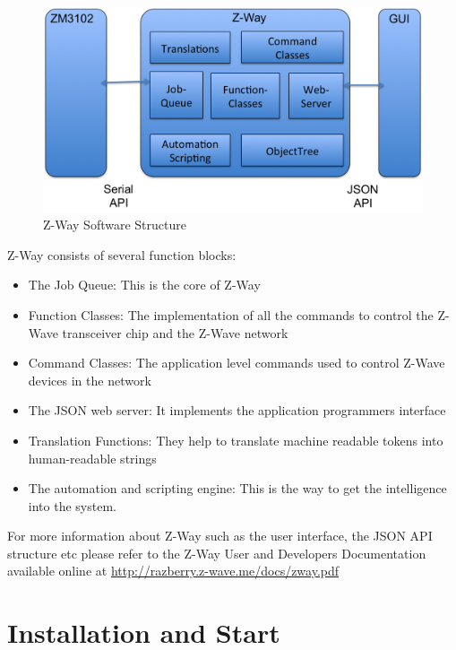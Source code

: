 \documentclass[10pt]{article}
\begin{document}
\begin{figure} 
\begin{center}
\includegraphics[scale=0.6]{pics/zway1en.png}
\caption{Z-Way Software Structure}
\label{zwaystructure} 
\end{center} 
\end{figure}

Z-Way consists of several function blocks:

\begin{itemize}
\item The Job Queue: This is the core of Z-Way
\item Function Classes: The implementation of all the commands to control the Z-Wave transceiver chip and the Z-Wave network
\item Command Classes: The application level commands used to control Z-Wave devices in the network
\item The JSON web server: It implements the application programmers interface
\item Translation Functions: They help to translate machine readable tokens into human-readable strings
\item The automation and scripting engine: This is the way to get the intelligence into the system.
\end{itemize}

For more information about Z-Way such as the user interface, the JSON API structure etc please refer to the Z-Way User and Developers 
Documentation available online at 
\href{http://razberry.z-wave.me/docs/zway.pdf}{http://razberry.z-wave.me/docs/zway.pdf}


\section{Installation and Start}
\end{document}
